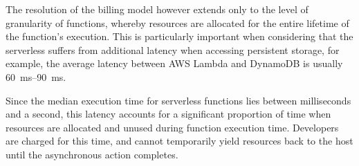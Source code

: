 The resolution of the billing model however extends only to the level of granularity of functions, whereby resources are allocated for the entire lifetime of the function's execution. This is particularly important when considering that the serverless suffers from additional latency when accessing persistent storage, for example, the average latency between AWS Lambda and DynamoDB is usually \qtyrange{60}{90}{\ms}\cite{caching-techniques-improve-latency-serverless}.

Since the median execution time for serverless functions lies between milliseconds and a second\cite{review-of-serverless-use-cases-and-characteristics}, this latency accounts for a significant proportion of time when resources are allocated and unused during function execution time. Developers are charged for this time, and cannot temporarily yield resources back to the host until the asynchronous action completes.
